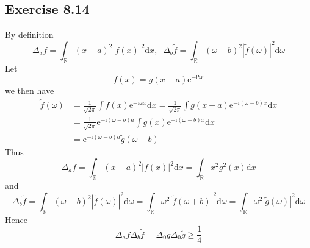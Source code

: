 \documentclass[]{ctexart}
\begin{document}
\subsection{Exercise 8.14}
By definition 
\begin{equation*}
\Delta_a f=\int_\mathbb R(x-a)^2|f(x)|^2\mathrm{d}x,\;\;\Delta_{b}\tilde{f}=\int_\mathbb R(\omega-b)^2|\tilde{f}(\omega)|^2\mathrm{d}\omega
\end{equation*}
Let 
\begin{equation*}
f(x)=g(x-a)\mathrm{e}^{-\mathrm{i}bx}
\end{equation*}
we then have 
\begin{align*}
\tilde{f}(\omega)&=\frac{1}{\sqrt{2\pi}}\int f(x)\mathrm{e}^{-\mathrm{i}\omega x}\mathrm{d}x=\frac{1}{\sqrt{2\pi}}\int g(x-a)\mathrm{e}^{-\mathrm{i}(\omega-b)x}\mathrm{d}x\\
&=\frac{1}{\sqrt{2\pi}}\mathrm{e}^{-\mathrm{i}(\omega-b)a}\int g(x)\mathrm{e}^{-\mathrm{i}(\omega-b)x}\mathrm{d}x\\
&=\mathrm{e}^{-\mathrm{i}(\omega-b)a}\tilde{g}(\omega-b)
\end{align*}
Thus 
\begin{equation*}
\Delta_a f=\int_\mathbb R(x-a)^2|f(x)|^2\mathrm{d}x=\int_\mathbb R x^2g^2(x)\mathrm{d}x
\end{equation*}
and
\begin{equation*}
\Delta_b\tilde{f}=\int_\mathbb R(\omega-b)^2|\tilde{f}(\omega)|^2\mathrm{d}\omega=\int_\mathbb R\omega^2|\tilde{f}(\omega+b)|^2\mathrm{d}\omega=\int_\mathbb R\omega^2|\tilde{g}(\omega)|^2\mathrm{d}\omega
\end{equation*}
Hence 
\begin{equation*}
\Delta_af\Delta_b\tilde{f}=\Delta_0 g\Delta_0\tilde{g}\ge\frac{1}{4}
\end{equation*}
\end{document}
